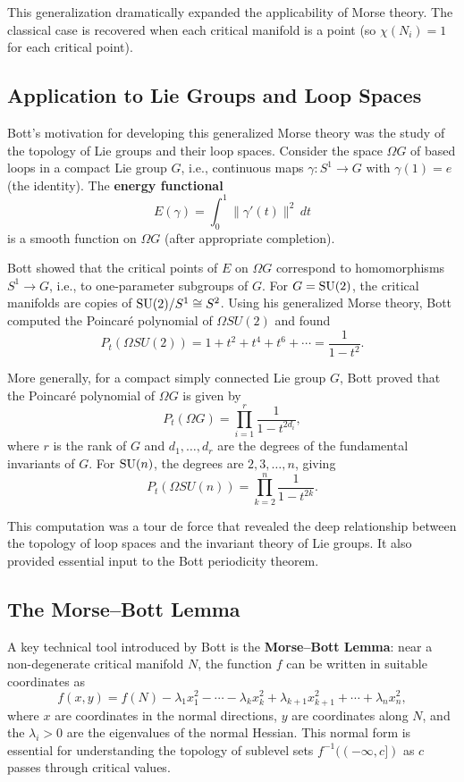 This generalization dramatically expanded the applicability of Morse theory. The classical case is recovered when each critical manifold is a point (so \(\chi(N_i) = 1\) for each critical point).

\subsection{Application to Lie Groups and Loop Spaces}

Bott's motivation for developing this generalized Morse theory was the study of the topology of Lie groups and their loop spaces. Consider the space \(\Omega G\) of based loops in a compact Lie group \(G\), i.e., continuous maps \(\gamma: S^1 \to G\) with \(\gamma(1) = e\) (the identity). The \textbf{energy functional}
\[
E(\gamma) = \int_0^1 \|\gamma'(t)\|^2 \, dt
\]
is a smooth function on \(\Omega G\) (after appropriate completion).

Bott showed that the critical points of \(E\) on \(\Omega G\) correspond to homomorphisms \(S^1 \to G\), i.e., to one-parameter subgroups of \(G\). For \(G = \operatorname{SU}(2)\), the critical manifolds are copies of \(\operatorname{SU}(2)/S^1 \cong S^2\). Using his generalized Morse theory, Bott computed the Poincar\'e polynomial of \(\Omega SU(2)\) and found
\[
P_t(\Omega SU(2)) = 1 + t^2 + t^4 + t^6 + \cdots = \frac{1}{1-t^2}.
\]

More generally, for a compact simply connected Lie group \(G\), Bott proved that the Poincar\'e polynomial of \(\Omega G\) is given by
\[
P_t(\Omega G) = \prod_{i=1}^r \frac{1}{1-t^{2d_i}},
\]
where \(r\) is the rank of \(G\) and \(d_1, \dots, d_r\) are the degrees of the fundamental invariants of \(G\). For \(\operatorname{SU}(n)\), the degrees are \(2, 3, \dots, n\), giving
\[
P_t(\Omega SU(n)) = \prod_{k=2}^n \frac{1}{1-t^{2k}}.
\]

This computation was a tour de force that revealed the deep relationship between the topology of loop spaces and the invariant theory of Lie groups. It also provided essential input to the Bott periodicity theorem.

\subsection{The Morse--Bott Lemma}

A key technical tool introduced by Bott is the \textbf{Morse--Bott Lemma}: near a non-degenerate critical manifold \(N\), the function \(f\) can be written in suitable coordinates as
\[
f(x,y) = f(N) - \lambda_1 x_1^2 - \cdots - \lambda_k x_k^2 + \lambda_{k+1} x_{k+1}^2 + \cdots + \lambda_{n} x_{n}^2,
\]
where \(x\) are coordinates in the normal directions, \(y\) are coordinates along \(N\), and the \(\lambda_i > 0\) are the eigenvalues of the normal Hessian. This normal form is essential for understanding the topology of sublevel sets \(f^{-1}((-\infty, c])\) as \(c\) passes through critical values.

